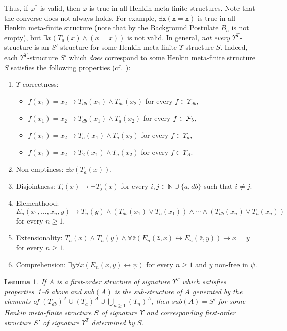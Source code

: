 \documentclass[preprint,11pt]{elsarticle}
\newtheorem{lemma}[theorem]{Lemma}
\theoremstyle{definition}
\theoremstyle{remark}
\begin{document}
Thus, if $\varphi^*$ is valid, then $\varphi$ is true in all Henkin meta-finite structures. Note that the converse does not always holds. For example, $\exists \mathtt{x} (\mathtt{x} = \mathtt{x})$ is true in all Henkin meta-finite structure (note that by the Background Postulate $B_a$ is not empty), but $\exists x (T_a(x) \wedge (x = x))$ is not valid. In general, \emph{not every} $\Upsilon^T$-structure is an $S'$ structure for some Henkin meta-finite $\Upsilon$-structure $S$.  Indeed, each $\Upsilon^T$-structure $S'$ which \emph{does} correspond to some Henkin meta-finite structure $S$ satisfies the following properties (cf.~\cite{Leivant94}):
\begin{enumerate}
\item $\Upsilon$-correctness: 
\begin{itemize}
\item $f(x_1) = x_2 \rightarrow T_{db}(x_1) \wedge T_{db}(x_2)$ for every $f \in \Upsilon_{db}$, 
\item $f(x_1) = x_2 \rightarrow T_{db}(x_1) \wedge T_{a}(x_2)$ for every $f \in {\cal F}_b$,
\item $f(x_1) = x_2 \rightarrow T_{a}(x_1) \wedge T_{a}(x_2)$ for every $f \in \Upsilon_{a}$,
\item $f(x_1) = x_2 \rightarrow T_2(x_1) \wedge T_{a}(x_2)$ for every $f \in \Upsilon_{\Lambda}$. 
\end{itemize}
\item Non-emptiness: $\exists x (T_{a}(x))$.
\item Disjointness: $T_i(x) \rightarrow \neg T_j(x)$ for every $i, j \in \mathbb{N} \cup \{a, db\}$ such that  $i \neq j$.
\item Elementhood: $E_n(x_1, \ldots, x_n, y) \rightarrow T_n(y) \wedge (T_{db}(x_1) \vee T_a(x_1)) \wedge \cdots \wedge (T_{db}(x_n) \vee T_a(x_n))$ for every $n \geq 1$.
\item Extensionality: $T_n(x) \wedge T_n(y) \wedge \forall \bar{z}(E_n(\bar{z}, x) \leftrightarrow  E_n(\bar{z}, y)) \rightarrow x = y$ for every $n \geq 1$.
\item Comprehension: $\exists y \forall \bar{x} (E_n(\bar{x}, y) \leftrightarrow \psi)$ for every $n \geq 1$ and $y$ non-free in $\psi$.  
\end{enumerate}
  
\begin{lemma}\label{hasHenkinS}
If $A$ is a first-order structure of signature $\Upsilon^T$ which satisfies properties~1--6 above and $\mathit{sub}(A)$ is the sub-structure of $A$ generated by the elements of $(T_{db})^A \cup (T_a)^A \cup \bigcup_{n \geq 1} (T_n)^A$, then $\mathit{sub}(A) = S'$ for some Henkin meta-finite structure $S$ of signature $\Upsilon$ and corresponding first-order structure $S'$ of signature $\Upsilon^T$ determined by $S$. 
\end{lemma}
\end{document}
